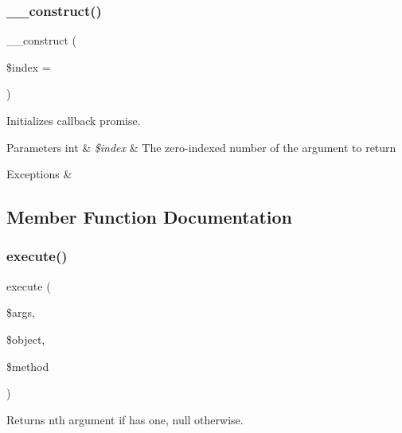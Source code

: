 \subsubsection{\texorpdfstring{\+\_\+\+\_\+construct()}{\_\_construct()}}
{\footnotesize\ttfamily \+\_\+\+\_\+construct (\begin{DoxyParamCaption}\item[{}]{\$index = {} }\end{DoxyParamCaption})}

Initializes callback promise.


\begin{DoxyParams}[1]{Parameters}
int & {\em \$index} & The zero-\/indexed number of the argument to return\\
\hline
\end{DoxyParams}

\begin{DoxyExceptions}{Exceptions}
{\em } & \\
\hline
\end{DoxyExceptions}


\subsection{Member Function Documentation}
\mbox{\label{class_prophecy_1_1_promise_1_1_return_argument_promise_a2b8542872672f9ac4ed0c942f931f0c6}} 
\subsubsection{\texorpdfstring{execute()}{execute()}}
{\footnotesize\ttfamily execute (\begin{DoxyParamCaption}\item[{array}]{\$args,  }\item[{\mbox{\hyperlink{class_prophecy_1_1_prophecy_1_1_object_prophecy}{Object\+Prophecy}}}]{\$object,  }\item[{\mbox{\hyperlink{class_prophecy_1_1_prophecy_1_1_method_prophecy}{Method\+Prophecy}}}]{\$method }\end{DoxyParamCaption})}

Returns nth argument if has one, null otherwise.


